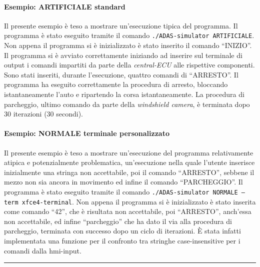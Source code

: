 \documentclass[11pt, openany]{article}
\theoremstyle{definition}
\theoremstyle{plain}
\theoremstyle{remark}
\begin{document}
		\paragraph{Esempio: ARTIFICIALE standard}
			Il presente esempio è teso a mostrare un'esecuzione tipica del programma.
			Il programma è stato eseguito tramite il comando \texttt{./ADAS-simulator ARTIFICIALE}. Non appena il programma si è inizializzato è stato inserito il comando ``INIZIO''. Il programma si è avviato correttamente iniziando ad inserire sul terminale di output i comandi impartiti da parte della \textit{central-ECU} alle rispettive componenti. Sono stati inseriti, durante l'esecuzione, quattro comandi di ``ARRESTO''. Il programma ha eseguito correttamente la procedura di arresto, bloccando istantaneamente l'auto e ripartendo la corsa istantaneamente. La procedura di parcheggio, ultimo comando da parte della \textit{windshield camera}, è terminata dopo 30 iterazioni (30 secondi).

		\paragraph{Esempio: NORMALE terminale personalizzato}
			Il presente esempio è teso a mostrare un'esecuzione del programma relativamente atipica e potenzialmente problematica, un'esecuzione nella quale l'utente inserisce inizialmente una stringa non accettabile, poi il comando ``ARRESTO'', sebbene il mezzo non sia ancora in movimento ed infine il comando ``PARCHEGGIO''.
			Il programma è stato eseguito tramite il comando \texttt{./ADAS-simulator NORMALE --term xfce4-terminal}. Non appena il programma si è inizializzato è stato inserita come comando ``42'', che è risultata non accettabile, poi ``ARRESTO'', anch'essa non accettabile, ed infine ``parcheggio'' che ha dato il via alla procedura di parcheggio, terminata con successo dopo un ciclo di iterazioni. È stata infatti implementata una funzione per il confronto tra stringhe case-insensitive per i comandi dalla hmi-input.

	\newpage
	\hrule
	\tableofcontents
\end{document}
